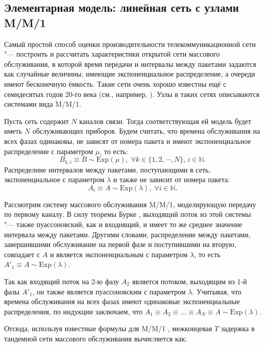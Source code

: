 \subsection{Элементарная модель: линейная сеть с узлами M/M/1}\label{sec:ch4_mm1_network}
Самый простой способ оценки производительности телекоммуникационной сети "--- построить и рассчитать характеристики открытой сети массового обслуживания, в которой время передачи и интервалы между пакетами задаются как случайные величины, имеющие экспоненциальное распределение, а очереди имеют бесконечную ёмкость. Такие сети очень хорошо известны ещё с семидесятых годов 20-го века (см., например, \cite{Kleinrock1970}). Узлы в таких сетях описываются системами вида M/M/1.

Пусть сеть содержит $N$ каналов связи. Тогда соответствующая ей модель будет иметь $N$ обслуживающих приборов. Будем считать, что времена обслуживания на всех фазах одинаковы, не зависят от номера пакета и имеют экспоненциальное распределение с параметром $\mu$, то есть:
$$
B_{k,i} \equiv B \sim \text{Exp}(\mu), \; \forall k \in \{1, 2, \cdots, N\},\, i \in \mathbb{N}.
$$
Распределние интервалов между пакетами, поступающими в сеть, экспоненциальное с параметром $\lambda$ и также не зависит от номера пакета:
$$
A_i \equiv A \sim \text{Exp}(\lambda), \; \forall i \in \mathbb{N}.
$$

Рассмотрим систему массового обслуживания M/M/1, моделирующую передачу по первому каналу. В силу теоремы Бурке \cite{Burke1956}, выходящий поток из этой системы "--- также пуассоновский, как и входнящий, и имеет то же среднее значение интервала между пакетами. Другими словами, распределение между пакетами, завершившими обслуживание на первой фазе и поступившими на вторую, совпадает с $A$ и является экспоненциальным с параметром $\lambda$, то есть $A'_1 \equiv A \sim \text{Exp}(\lambda)$.

Так как входящий поток на 2-ю фазу $A_2$ является потоком, выходящим из 1-й фазы $A'_1$, он также является пуассоновским с параметром $\lambda$. Учитывая, что времена обслуживания на всех фазах имеют одинаковые экспоненциальные распределения, по индукции заключаем, что $A_1 \equiv A_2 \equiv \dots \equiv A_N \equiv A \sim \text{Exp}(\lambda)$.

Отсюда, используя известные формулы для M/M/1 \cite{Kleinrock1979}, межконцевая $T$ задержка в тандемной сети массового обслуживания вычисляется как:

